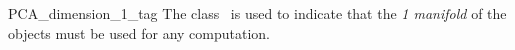 
\begin{ccRefClass}{PCA_dimension_1_tag}  
\ccDefinition
The class \ccRefName\ is used to indicate that the \textit{1 manifold} of the objects must be used for any computation.



\end{ccRefClass}
